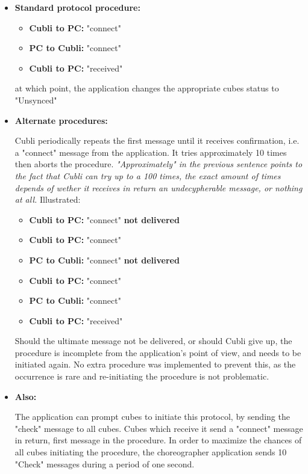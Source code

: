 \begin{itemize}
\item[] \textbf{Standard protocol procedure:}

\begin{itemize}
\item[] \textbf{Cubli to PC:} "connect"
\item[] \textbf{PC to Cubli:} "connect"
\item[] \textbf{Cubli to PC:} "received"
\end{itemize}

at which point, the application changes the appropriate cubes status to "Unsynced"\\

\item[] \textbf{Alternate procedures:}

Cubli periodically repeats the first message until it receives confirmation, i.e. a "connect" message from the application. It tries approximately 10 times then aborts the procedure. \textit{"Approximately" in the previous sentence points to the fact that Cubli can try up to a 100 times, the exact amount of times depends of wether it receives in return an undecypherable message, or nothing at all.} Illustrated:

\begin{itemize}
\item[] \textbf{Cubli to PC:} "connect" \textbf{not delivered}
\item[] \textbf{Cubli to PC:} "connect"
\item[] \textbf{PC to Cubli:} "connect" \textbf{not delivered}
\item[] \textbf{Cubli to PC:} "connect"
\item[] \textbf{PC to Cubli:} "connect" 
\item[] \textbf{Cubli to PC:} "received"
\end{itemize}

Should the ultimate message not be delivered, or should Cubli give up, the procedure is incomplete from the application's point of view, and needs to be initiated again. No extra procedure was implemented to prevent this, as the occurrence is rare and re-initiating the procedure is not problematic.


\item[] \textbf{Also:}

The application can prompt cubes to initiate this protocol, by sending the "check" message to all cubes. Cubes which receive it send a "connect" message in return, first message in the procedure. In order to maximize the chances of all cubes initiating the procedure, the choreographer application sends 10 "Check" messages during a period of one second.


\end{itemize}

